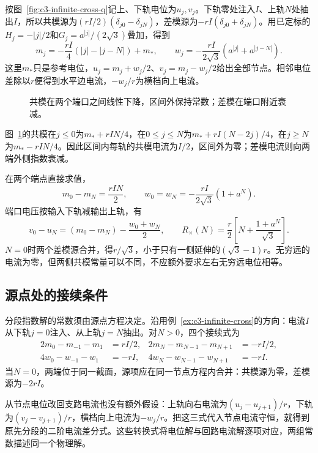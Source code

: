 \begin{solution}
按图~\ref{fig:c3-infinite-cross-q}记上、下轨电位为$u_j,v_j$。下轨零处注入$I$、上轨$N$处抽出$I$，所以共模源为$(rI/2)(\delta_{j0}-\delta_{jN})$，差模源为$-rI(\delta_{j0}+\delta_{jN})$。用已定标的$H_j=-|j|/2$和$G_j=a^{|j|}/(2\sqrt3)$叠加，得到
\[
 m_j=-\frac{rI}4(|j|-|j-N|)+m_*,\qquad
 w_j=-\frac{rI}{2\sqrt3}(a^{|j|}+a^{|j-N|}).
\]
这里$m_*$只是参考电位，$u_j=m_j+w_j/2$、$v_j=m_j-w_j/2$给出全部节点。相邻电位差除以$r$便得到水平边电流，$-w_j/r$为横档向上电流。
\begin{figure}[H]\centering
{}
\caption{共模在两个端口之间线性下降，区间外保持常数；差模在端口附近衰减。}\label{fig:c3-infinite-cross-s}
\end{figure}
图~\ref{fig:c3-infinite-cross-s}的共模在$j\le0$为$m_*+rIN/4$，在$0\le j\le N$为$m_*+rI(N-2j)/4$，在$j\ge N$为$m_*-rIN/4$。因此区间内每轨的共模电流为$I/2$，区间外为零；差模电流则向两端外侧指数衰减。

在两个端点直接求值，
\[
 m_0-m_N=\frac{rIN}2,\qquad
 w_0=w_N=-\frac{rI}{2\sqrt3}(1+a^N).
\]
端口电压按输入下轨减输出上轨，有
\[
 v_0-u_N=(m_0-m_N)-\frac{w_0+w_N}2,
 \qquad\boxed{R_\times(N)=\frac r2\left[N+\frac{1+a^N}{\sqrt3}\right]}.
\]
$N=0$时两个差模源合并，得$r/\sqrt3$，小于只有一侧延伸的$(\sqrt3-1)r$。无穷远的电流为零，但两侧共模常量可以不同，不应额外要求左右无穷远电位相等。
\end{solution}
\subsection{源点处的接续条件}\label{sec:c3-junction}
分段指数解的常数须由源点方程决定。沿用例~\ref{ex:c3-infinite-cross}的方向：电流$I$从下轨$j=0$注入、从上轨$j=N$抽出。对$N>0$，四个接续式为
\begin{align*}
 2m_0-m_{-1}-m_1&=rI/2,&
 2m_N-m_{N-1}-m_{N+1}&=-rI/2,\\
 4w_0-w_{-1}-w_1&=-rI,&
 4w_N-w_{N-1}-w_{N+1}&=-rI.
\end{align*}
当$N=0$，两端位于同一截面，源项应在同一节点方程内合并：共模源为零，差模源为$-2rI$。

从节点电位改回支路电流也没有额外假设：上轨向右电流为$(u_j-u_{j+1})/r$，下轨为$(v_j-v_{j+1})/r$，横档向上电流为$-w_j/r$。把这三式代入节点电流守恒，就得到原先分段的二阶电流差分式。这些转换式将电位解与回路电流解逐项对应，两组常数描述同一个物理解。

